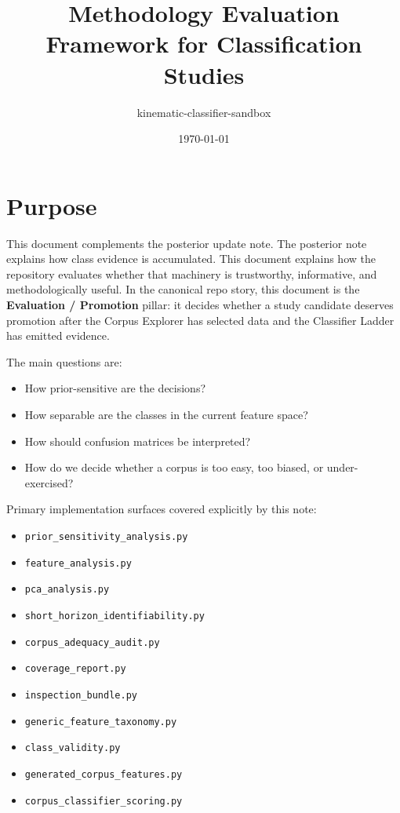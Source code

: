 \documentclass[11pt]{article}
\title{Methodology Evaluation Framework for Classification Studies}
\author{kinematic-classifier-sandbox}
\date{\today}
\begin{document}
\maketitle

\section{Purpose}

This document complements the posterior update note. The posterior note explains
how class evidence is accumulated. This document explains how the repository
evaluates whether that machinery is trustworthy, informative, and methodologically
useful. In the canonical repo story, this document is the
\textbf{Evaluation / Promotion} pillar: it decides whether a study candidate
deserves promotion after the Corpus Explorer has selected data and the
Classifier Ladder has emitted evidence.

The main questions are:
\begin{itemize}[leftmargin=1.5em]
    \item How prior-sensitive are the decisions?
    \item How separable are the classes in the current feature space?
    \item How should confusion matrices be interpreted?
    \item How do we decide whether a corpus is too easy, too biased, or
    under-exercised?
\end{itemize}

Primary implementation surfaces covered explicitly by this note:
\begin{itemize}[leftmargin=1.5em]
    \item \texttt{prior\_sensitivity\_analysis.py}
    \item \texttt{feature\_analysis.py}
    \item \texttt{pca\_analysis.py}
    \item \texttt{short\_horizon\_identifiability.py}
    \item \texttt{corpus\_adequacy\_audit.py}
    \item \texttt{coverage\_report.py}
    \item \texttt{inspection\_bundle.py}
    \item \texttt{generic\_feature\_taxonomy.py}
    \item \texttt{class\_validity.py}
    \item \texttt{generated\_corpus\_features.py}
    \item \texttt{corpus\_classifier\_scoring.py}
\end{itemize}
\end{document}
